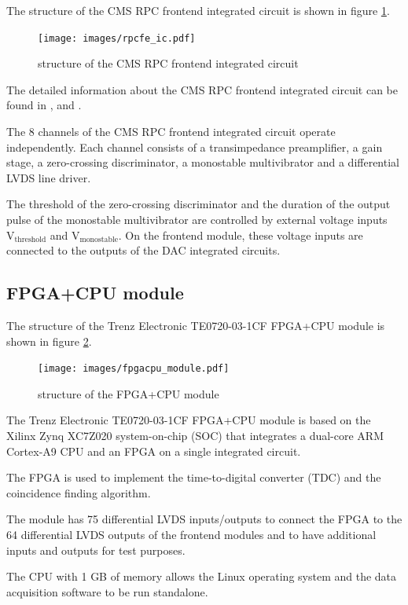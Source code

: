 \documentclass[12pt, a4paper]{article}
\begin{document}
The structure of the CMS RPC frontend integrated circuit is shown in figure \ref{fig:rpcfe_ic}.

\begin{figure}[h!]
  \centering
  \texttt{[image: images/rpcfe\_ic.pdf]}
  \caption{structure of the CMS RPC frontend integrated circuit}
  \label{fig:rpcfe_ic}
\end{figure}

The detailed information about the CMS RPC frontend integrated circuit can be found in \cite{rpcnim2000}, \cite{lhcb2002} and \cite{rpcreview2000}.

The 8 channels of the CMS RPC frontend integrated circuit operate independently. Each channel consists of a transimpedance preamplifier, a gain stage, a zero-crossing discriminator, a monostable multivibrator and a differential LVDS line driver.

The threshold of the zero-crossing discriminator and the duration of the output pulse of the monostable multivibrator are controlled by external voltage inputs $\text{V}_\text{threshold}$ and $\text{V}_\text{monostable}$. On the frontend module, these voltage inputs are connected to the outputs of the DAC integrated circuits.

\subsection{FPGA+CPU module}

The structure of the Trenz Electronic TE0720-03-1CF FPGA+CPU module is shown in figure \ref{fig:fpgacpu_module}.

\begin{figure}[h!]
  \centering
  \texttt{[image: images/fpgacpu\_module.pdf]}
  \caption{structure of the FPGA+CPU module}
  \label{fig:fpgacpu_module}
\end{figure}

The Trenz Electronic TE0720-03-1CF FPGA+CPU module is based on the Xilinx Zynq XC7Z020 system-on-chip (SOC) that integrates a dual-core ARM Cortex-A9 CPU and an FPGA on a single integrated circuit.

The FPGA is used to implement the time-to-digital converter (TDC) and the coincidence finding algorithm.

The module has 75 differential LVDS inputs/outputs to connect the FPGA to the 64 differential LVDS outputs of the frontend modules and to have additional inputs and outputs for test purposes.

The CPU with 1 GB of memory allows the Linux operating system and the data acquisition software to be run standalone.
\end{document}
